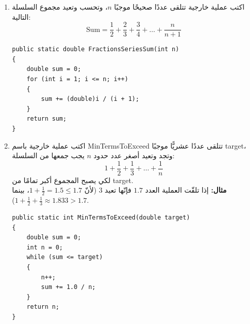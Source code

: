 \documentclass[14pt]{extarticle}
\begin{document}
\begin{enumerate}[resume, itemsep=2em]
\item اكتب عملية خارجية تتلقى عددًا صحيحًا موجبًا $n$، وتحسب وتعيد مجموع السلسلة التالية:
\[ \text{Sum} = \frac{1}{2} + \frac{2}{3} + \frac{3}{4} + \dots + \frac{n}{n+1} \]
\ifwithsols
\begin{boxSolution}
\begin{english}
\begin{verbatim}
public static double FractionsSeriesSum(int n)
{
    double sum = 0;
    for (int i = 1; i <= n; i++)
    {
        sum += (double)i / (i + 1);
    }
    return sum;
}
\end{verbatim}
\end{english}
\end{boxSolution}
\fi
\filbreak

\item اكتب عملية خارجية باسم \textenglish{MinTermsToExceed} تتلقى عددًا عشريًّا موجبًا \textenglish{target}، وتجد وتعيد أصغر عدد حدود $n$ يجب جمعها من السلسلة:
\[ 1 + \frac{1}{2} + \frac{1}{3} + \dots + \frac{1}{n} \]
لكي يصبح المجموع أكبر تمامًا من \textenglish{target}. \\
\textbf{مثال:} إذا تلقّت العملية العدد $1.7$ فإنّها تعيد $3$ (لأنّ $1 + \frac{1}{2} = 1.5 \le 1.7$، بينما $1 + \frac{1}{2} + \frac{1}{3} \approx 1.833 > 1.7$).
\ifwithsols
\begin{boxSolution}
\begin{english}
\begin{verbatim}
public static int MinTermsToExceed(double target)
{
    double sum = 0;
    int n = 0;
    while (sum <= target)
    {
        n++;
        sum += 1.0 / n;
    }
    return n;
}
\end{verbatim}
\end{english}
\end{boxSolution}
\fi
\filbreak


\end{enumerate}
\end{document}
